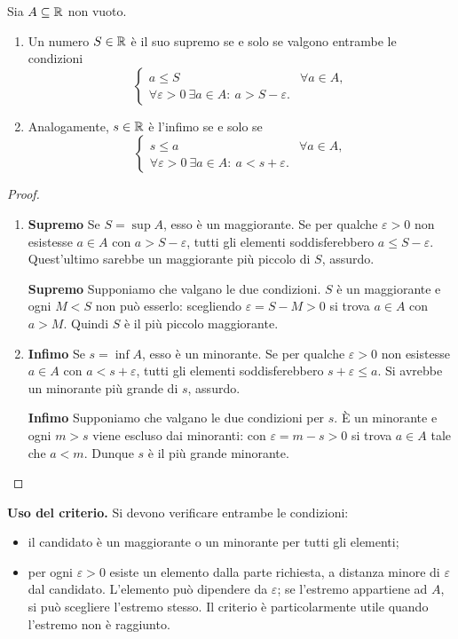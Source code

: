 \begin{proposizione}
\label{prop:criterio-estremi}
Sia $A\subseteq\mathbb{R}$ non vuoto. \begin{enumerate}[label=\arabic*.]
\item Un numero $S\in\mathbb{R}$ è il suo supremo se e solo se valgono entrambe le condizioni
\[
  \begin{cases}
    a\le S&\forall a\in A,\\
    \forall\varepsilon>0\ \exists a\in A:\ a>S-\varepsilon.
  \end{cases}
\]
\item Analogamente, $s\in\mathbb{R}$ è l'infimo se e solo se
\[
  \begin{cases}
    s\le a&\forall a\in A,\\
    \forall\varepsilon>0\ \exists a\in A:\ a<s+\varepsilon.
  \end{cases}
\]
\end{enumerate}
\end{proposizione}
\begin{proof}
\begin{enumerate}[label=\arabic*.]
\item \textbf{Supremo}\enspace\passomath{\Rightarrow} Se $S=\sup A$, esso è un maggiorante. Se per qualche $\varepsilon>0$ non esistesse $a\in A$ con $a>S-\varepsilon$, tutti gli elementi soddisferebbero $a\le S-\varepsilon$. Quest'ultimo sarebbe un maggiorante più piccolo di $S$, assurdo.

\textbf{Supremo}\enspace\passomath{\Leftarrow} Supponiamo che valgano le due condizioni. $S$ è un maggiorante e ogni $M<S$ non può esserlo: scegliendo $\varepsilon=S-M>0$ si trova $a\in A$ con $a>M$. Quindi $S$ è il più piccolo maggiorante.
\item \textbf{Infimo}\enspace\passomath{\Rightarrow} Se $s=\inf A$, esso è un minorante. Se per qualche $\varepsilon>0$ non esistesse $a\in A$ con $a<s+\varepsilon$, tutti gli elementi soddisferebbero $s+\varepsilon\le a$. Si avrebbe un minorante più grande di $s$, assurdo.

\textbf{Infimo}\enspace\passomath{\Leftarrow} Supponiamo che valgano le due condizioni per $s$. È un minorante e ogni $m>s$ viene escluso dai minoranti: con $\varepsilon=m-s>0$ si trova $a\in A$ tale che $a<m$. Dunque $s$ è il più grande minorante.
\end{enumerate}
\end{proof}

\textbf{Uso del criterio.} Si devono verificare entrambe le condizioni:
\begin{itemize}
  \item il candidato è un maggiorante o un minorante per tutti gli elementi;
  \item per ogni $\varepsilon>0$ esiste un elemento dalla parte richiesta, a distanza minore di $\varepsilon$ dal candidato. L'elemento può dipendere da $\varepsilon$; se l'estremo appartiene ad $A$, si può scegliere l'estremo stesso. Il criterio è particolarmente utile quando l'estremo non è raggiunto.
\end{itemize}

